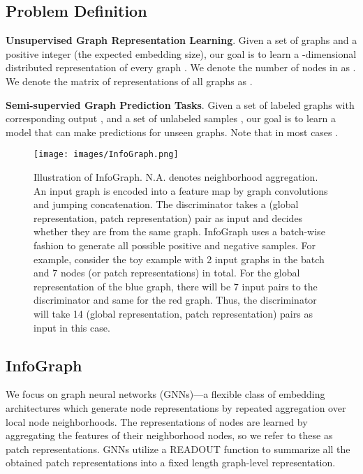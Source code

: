 \documentclass{article} \usepackage{iclr2020_conference,times}
\newcommand{\xhdr}[1]{{\noindent\bfseries #1}.}
\def\method{InfoGraph}
\begin{document}
\subsection{Problem Definition}

\xhdr{Unsupervised Graph Representation Learning} 
Given a set of graphs  and a positive integer  (the expected embedding size), our goal is to learn a -dimensional distributed representation of every graph . We denote the number of nodes in  as . We denote the matrix of representations of all graphs as .

\xhdr{Semi-supervied Graph Prediction Tasks} Given a set of labeled graphs  with corresponding output , and a set of unlabeled samples , our goal is to learn a model that can make predictions for unseen graphs. Note that in most cases .








 














\begin{figure}[t]
    \centering
    \texttt{[image: images/InfoGraph.png]}
    \caption{Illustration of \method{}. N.A. denotes neighborhood aggregation. An input graph is encoded into a feature map by graph convolutions and jumping concatenation. The discriminator takes a (global representation, patch representation) pair as input and decides whether they are from the same graph. \method{} uses a batch-wise fashion to generate all possible positive and negative samples. For example, consider the toy example with 2 input graphs in the batch and 7 nodes (or patch representations) in total. For the global representation of the blue graph, there will be 7 input pairs to the discriminator and same for the red graph. Thus, the discriminator will take 14 (global representation, patch representation) pairs as input in this case.}
    \label{fig:gnn-infomax}
\end{figure}
\subsection{\method{}}


We focus on graph neural networks (GNNs)---a flexible class of embedding architectures which generate node representations by repeated aggregation over local node neighborhoods. The representations of nodes are learned by aggregating the features of their neighborhood nodes, so we refer to these as patch representations. GNNs utilize a READOUT function to summarize all the obtained patch representations into a fixed length graph-level representation.
\end{document}
